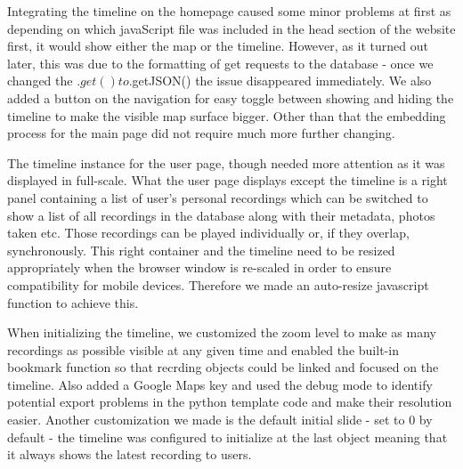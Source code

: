 \documentclass{l3proj}
\begin{document}
Integrating the timeline on the homepage caused some minor problems at first as depending on which javaScript file was included in the head section of the website first, it would show either the map or the timeline.
However, as it turned out later, this was due to the formatting of get requests to the database - once we changed the $.get() to $.getJSON() the issue disappeared immediately. We also added a button on the navigation for easy toggle between showing and hiding the timeline to make the visible map surface bigger.
Other than that the embedding process for the main page did not require much more further changing.

The timeline instance for the user page, though needed more attention as it was displayed in full-scale. What the user page displays except the timeline is a right panel containing a list of user's personal recordings which can be switched to show a list of all recordings in the database along with their metadata, photos taken etc.
Those recordings can be played individually or, if they overlap, synchronously. This right container and the timeline need to be resized appropriately when the browser window is re-scaled in order to ensure compatibility for mobile devices.
Therefore we made an auto-resize javascript function to achieve this.

When initializing the timeline, we customized the zoom level to make as many recordings as possible visible at any given time and enabled the built-in bookmark function so that recrding objects could be linked and focused on the timeline.
Also added a Google Maps key and used the debug mode to identify potential export problems in the python template code and make their resolution easier. Another customization we made is the default initial slide - set to 0 by default - the timeline was configured to initialize at the last object meaning that it always shows the latest recording to users.
\end{document}

